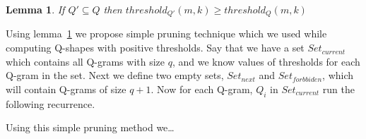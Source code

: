 \documentclass[paper=a4, fontsize=11pt]{scrartcl} %
\newtheorem{lemma}[theorem]{Lemma}
\numberwithin{equation}{section} %
\numberwithin{figure}{section} %
\numberwithin{table}{section} %
\begin{document}
\begin{lemma}
    \label{subSetLemma}
    If $Q' \subseteq Q$ then $threshold_{Q'}(m,k) \geq threshold_{Q}(m,k)$
\end{lemma}

Using lemma~\ref{subSetLemma} we propose simple pruning technique which we used while computing Q-shapes with positive thresholds.
Say that we have a set $Set_{current}$ which contains all Q-grams with size $q$, and we know values of thresholds for each Q-gram in the set. Next we define two empty sets, $Set_{next}$ and $Set_{forbbiden}$, which will contain Q-grams of size $q+1$. Now for each Q-gram, $Q_{i}$ in $Set_{current}$ run the following recurrence.

 \begin{algorithmic}
     \ENDFOR
 \end{algorithmic}
Using this simple pruning method we\dots
\end{document}
